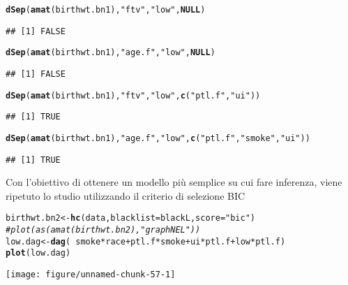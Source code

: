 \documentclass{article}\usepackage[]{graphicx}\usepackage[]{color}
\makeatletter
\def\maxwidth{ %
  \ifdim\Gin@nat@width>\linewidth
    \linewidth
  \else
    \Gin@nat@width
  \fi
}
\newcommand{\hlstr}[1]{\textcolor[rgb]{0.192,0.494,0.8}{#1}}%
\newcommand{\hlcom}[1]{\textcolor[rgb]{0.678,0.584,0.686}{\textit{#1}}}%
\newcommand{\hlopt}[1]{\textcolor[rgb]{0,0,0}{#1}}%
\newcommand{\hlstd}[1]{\textcolor[rgb]{0.345,0.345,0.345}{#1}}%
\newcommand{\hlkwa}[1]{\textcolor[rgb]{0.161,0.373,0.58}{\textbf{#1}}}%
\newcommand{\hlkwb}[1]{\textcolor[rgb]{0.69,0.353,0.396}{#1}}%
\newcommand{\hlkwc}[1]{\textcolor[rgb]{0.333,0.667,0.333}{#1}}%
\newcommand{\hlkwd}[1]{\textcolor[rgb]{0.737,0.353,0.396}{\textbf{#1}}}%
\newenvironment{kframe}{%
 \def\at@end@of@kframe{}%
 \ifinner\ifhmode%
  \def\at@end@of@kframe{\end{minipage}}%
  \begin{minipage}{\columnwidth}%
 \fi\fi%
 \def\FrameCommand##1{\hskip\@totalleftmargin \hskip-\fboxsep
 \colorbox{shadecolor}{##1}\hskip-\fboxsep
     \hskip-\linewidth \hskip-\@totalleftmargin \hskip\columnwidth}%
 \MakeFramed {\advance\hsize-\width
   \@totalleftmargin\z@ \linewidth\hsize
   \@setminipage}}%
 {\par\unskip\endMakeFramed%
 \at@end@of@kframe}
\newenvironment{knitrout}{}{} %
\makeatother
\begin{document}
\begin{knitrout}
\color{fgcolor}\begin{kframe}
\begin{alltt}
\hlkwd{dSep}\hlstd{(}\hlkwd{amat}\hlstd{(birthwt.bn1),}\hlstr{"ftv"}\hlstd{,}\hlstr{"low"}\hlstd{,}\hlkwa{NULL}\hlstd{)}
\end{alltt}
\begin{verbatim}
## [1] FALSE
\end{verbatim}
\begin{alltt}
\hlkwd{dSep}\hlstd{(}\hlkwd{amat}\hlstd{(birthwt.bn1),}\hlstr{"age.f"}\hlstd{,}\hlstr{"low"}\hlstd{,}\hlkwa{NULL}\hlstd{)}
\end{alltt}
\begin{verbatim}
## [1] FALSE
\end{verbatim}
\begin{alltt}
\hlkwd{dSep}\hlstd{(}\hlkwd{amat}\hlstd{(birthwt.bn1),}\hlstr{"ftv"}\hlstd{,}\hlstr{"low"}\hlstd{,}\hlkwd{c}\hlstd{(}\hlstr{"ptl.f"}\hlstd{,}\hlstr{"ui"}\hlstd{))}
\end{alltt}
\begin{verbatim}
## [1] TRUE
\end{verbatim}
\begin{alltt}
\hlkwd{dSep}\hlstd{(}\hlkwd{amat}\hlstd{(birthwt.bn1),}\hlstr{"age.f"}\hlstd{,}\hlstr{"low"}\hlstd{,}\hlkwd{c}\hlstd{(}\hlstr{"ptl.f"}\hlstd{,}\hlstr{"smoke"}\hlstd{,}\hlstr{"ui"}\hlstd{))}
\end{alltt}
\begin{verbatim}
## [1] TRUE
\end{verbatim}
\end{kframe}
\end{knitrout}

Con l'obiettivo di ottenere un modello più semplice su cui fare inferenza, viene ripetuto lo studio utilizzando il criterio di selezione BIC

\begin{knitrout}
\color{fgcolor}\begin{kframe}
\begin{alltt}
\hlstd{birthwt.bn2} \hlkwb{<-} \hlkwd{hc}\hlstd{(data,}\hlkwc{blacklist}\hlstd{=blackL,}\hlkwc{score}\hlstd{=}\hlstr{"bic"}\hlstd{)}
\hlcom{#plot(as(amat(birthwt.bn2),"graphNEL"))}
\hlstd{low.dag} \hlkwb{<-} \hlkwd{dag}\hlstd{(}\hlopt{~}\hlstd{smoke}\hlopt{*}\hlstd{race} \hlopt{+} \hlstd{ptl.f}\hlopt{*}\hlstd{smoke} \hlopt{+} \hlstd{ui}\hlopt{*}\hlstd{ptl.f} \hlopt{+} \hlstd{low}\hlopt{*}\hlstd{ptl.f)}
\hlkwd{plot}\hlstd{(low.dag)}
\end{alltt}
\end{kframe}
\texttt{[image: figure/unnamed-chunk-57-1]} 
\end{knitrout}
\end{document}

